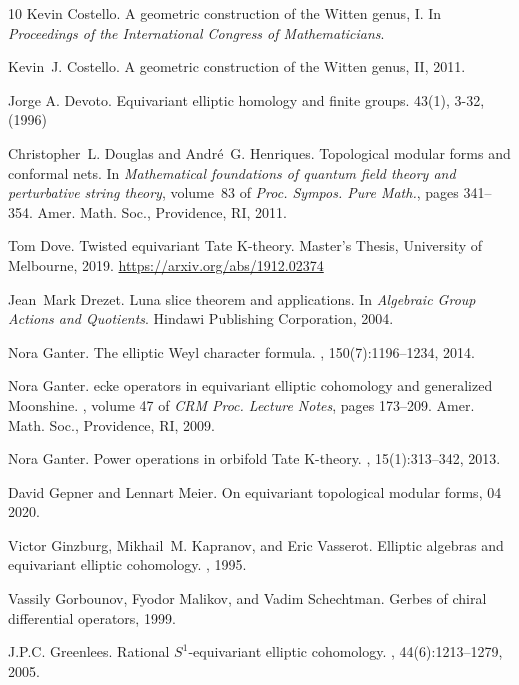 \documentclass[11pt,letterpaper]{amsart}
\begin{document}
\begin{thebibliography}{10}
Kevin Costello.
\newblock A geometric construction of the {W}itten genus, {I}.
\newblock In {\em Proceedings of the International Congress of Mathematicians}.

Kevin~J. Costello.
\newblock A geometric construction of the {W}itten genus, {II}, 2011.

Jorge A. Devoto.
\newblock Equivariant elliptic homology and finite groups. 
 43(1), 3-32, (1996)

Christopher~L. Douglas and Andr\'{e}~G. Henriques.
\newblock Topological modular forms and conformal nets.
\newblock In {\em Mathematical foundations of quantum field theory and
  perturbative string theory}, volume~83 of {\em Proc. Sympos. Pure Math.},
  pages 341--354. Amer. Math. Soc., Providence, RI, 2011.
  
Tom Dove.
\newblock Twisted equivariant {T}ate {K}-theory.
\newblock Master's Thesis, University of Melbourne, 2019.
\newblock \url{https://arxiv.org/abs/1912.02374}

Jean~Mark Drezet.
\newblock Luna slice theorem and applications.
\newblock In {\em Algebraic Group Actions and Quotients}. Hindawi Publishing
  Corporation, 2004.

Nora Ganter.
\newblock The elliptic {W}eyl character formula.
, 150(7):1196–1234, 2014.

Nora Ganter. 
ecke operators in equivariant elliptic cohomology and generalized {M}oonshine. 
, volume 47 of {\em CRM Proc. Lecture Notes}, pages 173–209. Amer. Math.
Soc., Providence, RI, 2009.

Nora Ganter. 
\newblock Power operations in orbifold Tate K-theory.
, 15(1):313–342, 2013.

David Gepner and Lennart Meier.
\newblock On equivariant topological modular forms, 04 2020.

Victor Ginzburg, Mikhail~M. Kapranov, and Eric Vasserot.
\newblock Elliptic algebras and equivariant elliptic cohomology.
, 1995.

Vassily Gorbounov, Fyodor Malikov, and Vadim Schechtman.
\newblock Gerbes of chiral differential operators, 1999.

J.P.C. Greenlees.
\newblock Rational ${S}^1$-equivariant elliptic cohomology.
, 44(6):1213--1279, 2005.


\end{thebibliography}
\end{document}
